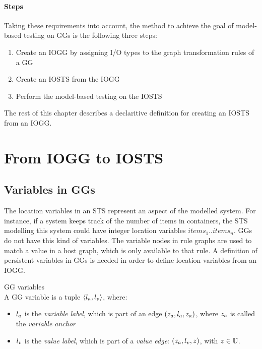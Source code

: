 \paragraph*{Steps} Taking these requirements into account, the method to achieve the goal of model-based testing on GGs is the following three steps:
\begin{enumerate}
\item Create an IOGG by assigning I/O types to the graph transformation rules of a GG
\item Create an IOSTS from the IOGG
\item Perform the model-based testing on the IOSTS
\end{enumerate}
The rest of this chapter describes a declaritive definition for creating an IOSTS from an IOGG.

\section{From IOGG to IOSTS}\label{sec:algorithm}
\subsection{Variables in GGs} 
The location variables in an STS represent an aspect of the modelled system. For instance, if a system keeps track of the number of items in containers, the STS modelling this system could have integer location variables $\mathit{items}_1..\mathit{items}_n$. GGs do not have this kind of variables. The variable nodes in rule graphs are used to match a value in a host graph, which is only available to that rule. A definition of persistent variables in GGs is needed in order to define location variables from an IOGG.

\vspace{10px}
\begin{definition} GG variables \\
A GG variable is a tuple $\langle l_a, l_v\rangle$, where:
\begin{itemize}
\item {}$l_a$ is the \textit{variable label}, which is part of an edge $(z_a, l_a, z_a)$, where $z_a$ is called the \textit{variable anchor}
\item {}$l_v$ is the \textit{value label}, which is part of a \textit{value edge}: $(z_a, l_v, z)$, with $z \in \mathbb{U}$.
\end{itemize}
\end{definition}
\vspace{10px}

